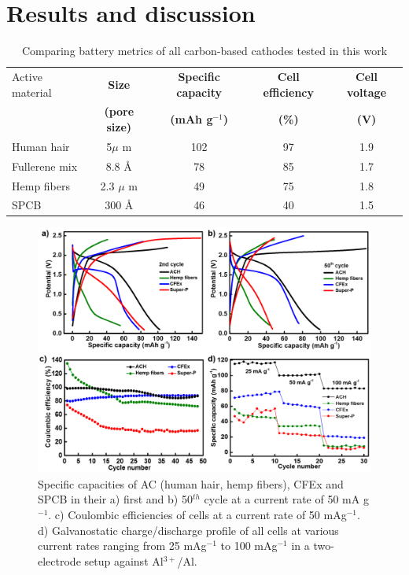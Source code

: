 \section{Results and discussion}

\begin{table}[h!]
\caption{Comparing battery metrics of all carbon-based cathodes tested in this work} \label{table1bm}
\begin{center}
\begin{tabular}{|lcccc|}
\hline
Active material & {\textbf{Size}} & {\textbf{Specific capacity}} & {\textbf{Cell efficiency}} & {\textbf{Cell voltage}}\\
 & {\textbf{(pore size)}} & {\textbf{(mAh g$^{-1}$)}} & {\textbf{(\%)}} & {\textbf{(V)}}\\
\hline
Human hair & 5${\mu}$ m & 102 & 97 & 1.9 \\
Fullerene mix & 8.8 \AA & 78 & 85 & 1.7 \\
Hemp fibers & 2.3 $\mu$ m & 49 & 75 & 1.8 \\
SPCB & 300 \AA & 46 & 40 & 1.5 \\
\hline  %
\end{tabular}
\end{center}
\end{table}

\begin{figure}[h]
  \centering
  \includegraphics[width=\textwidth]{Figures/chap5fig/cdcall}
    \caption{Specific capacities of AC (human hair, hemp fibers), CFEx and SPCB in their a) first and b) 50$^{th}$ cycle at a current rate of 50 mA g$^{-1}$. c) Coulombic efficiencies of cells at a current rate of 50 mAg$^{-1}$. d) Galvanostatic charge/discharge profile of all cells at various current rates ranging from 25 mAg$^{-1}$ to 100 mAg$^{-1}$ in a two-electrode setup against Al$^{3+}$/Al.}
  \label{Figures/chap5fig:cdcall}
\end{figure}

